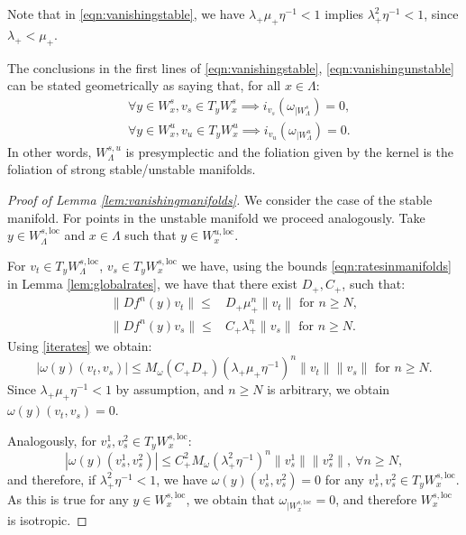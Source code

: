\documentclass[11pt]{amsart}
\theoremstyle{definition}
\theoremstyle{remark}
\numberwithin{equation}{section}
\begin{document}
Note that in \eqref{eqn:vanishingstable}, we have $\lambda_+\mu_+\eta^{-1}<1$ implies $\lambda_+^2\eta^{-1}<1$, since $\lambda_+<\mu_+$.

The conclusions in
the first lines of  \eqref{eqn:vanishingstable},
\eqref{eqn:vanishingunstable} can
be stated geometrically as saying that,
for all $x \in \Lambda$:
\begin{equation}\label{vanishing_geometric}
  \begin{split}
& \forall y \in W^s_x,  v_s  \in T_y W^s_x
\implies i_{v_s} (\omega_{\mid W^s_\Lambda}) = 0 ,\\
    & \forall y \in W^u_x,  v_u \in T_y W^u_x
\implies i_{v_u}(\omega_{\mid W^u_\Lambda}) = 0 .
\end{split}
\end{equation}
In other words, $W^{s,u}_\Lambda$ is presymplectic and the foliation
given by the kernel is  the foliation of strong stable/unstable manifolds.



\begin{proof}[Proof of Lemma \ref{lem:vanishingmanifolds}]
We consider the case of the stable manifold. For points in the unstable manifold we proceed analogously.
Take $y \in  W^{s,\textrm{loc}}_\Lambda $ and $x \in \Lambda$ such that $y\in W^{u,\mathrm{loc}}_x$.

For $v_t\in T_y W^{s,\mathrm{loc}}_\Lambda$, $v_s\in T_y W^{s,\mathrm{loc}}_x$ we have, using the bounds \eqref{eqn:ratesinmanifolds} in Lemma \ref{lem:globalrates}, we have that there exist $D_+, C_+$, such that:
\begin{equation}\begin{split}
\|Df^n(y) v_t\|\leq& D_+\mu_+^n\|v_t\|\textrm { for } n\geq N,\\
\|Df^n(y) v_s\|\leq& C_+\lambda_+^n\|v_s\|\textrm { for } n\geq N.
\end{split}
\end{equation}
Using \eqref{iterates} we obtain:
\[
|\omega(y)(v_t,v_s)| \leq M_\omega  (C_+D_+)(\lambda_+\mu_+\eta^{-1})^n\|v_t\|\|v_s\| \textrm { for } n\geq N.
\]
Since $ \lambda_+\mu_+\eta^{-1} <1$ by assumption, and $n\geq N$ is arbitrary, we obtain $\omega (y)(v_t,v_s)=0$.


Analogously,  for  $v^1_s, v^2_s\in T_yW^{s,\mathrm{loc}}_x$:
\[
|\omega(y)(v^1_s,v^2_s)|\le C_+^2 M_\omega (\lambda_+^2\eta^{-1})^n\|v^1_s\| \|v^2_s\|, \ \forall n\ge N,
\]
and therefore, if $ \lambda_+^2\eta^{-1} <1$, we have $\omega(y)(v^1_s,v^2_s)=0$ for any $v^1_s,v^2_s \in T_y{W^{s,\mathrm{loc}}_x}$.
As this is true for any
$y\in W^{s,\mathrm{loc}}_x$, we obtain that $\omega_{\mid W^{s,\mathrm{loc}}_x}=0$, and therefore $W^{s,\mathrm{loc}}_x$ is isotropic.

\end{proof}
\end{document}
